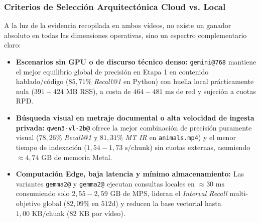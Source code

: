 \subsubsection{Criterios de Selección Arquitectónica Cloud vs. Local}
A la luz de la evidencia recopilada en ambos vídeos, no existe un ganador absoluto en todas las dimensiones operativas, sino un espectro complementario claro:
\begin{itemize}
    \item \textbf{Escenarios sin GPU o de discurso técnico denso:} \texttt{gemini@768} mantiene el mejor equilibrio global de precisión en Etapa 1 en contenido hablado/código ($85,71\%$ \textit{Recall@1} en Python) con huella local prácticamente nula ($391-424\text{ MB}$ RSS), a costa de $464-481\text{ ms}$ de red y sujeción a cuotas RPD.
    \item \textbf{Búsqueda visual en metraje documental o alta velocidad de ingesta privada:} \texttt{qwen3-vl-2b@} ofrece la mejor combinación de precisión puramente visual ($78,26\%$ \textit{Recall@1} y $81,31\%$ \textit{MT IR} en \texttt{animals.mp4}) y el menor tiempo de indexación ($1,54-1,73\text{ s/chunk}$) sin cuotas externas, asumiendo $\approx 4,74\text{ GB}$ de memoria Metal.
    \item \textbf{Computación Edge, baja latencia y mínimo almacenamiento:} Las variantes \texttt{gemma2@} y \texttt{gemma2@} ejecutan consultas locales en $\approx 30\text{ ms}$ consumiendo solo $2,55-2,59\text{ GB}$ de MPS, lideran el \textit{Interval Recall} multi-objetivo global ($82,09\%$ en $512\text{d}$) y reducen la base vectorial hasta $1,00\text{ KB/chunk}$ ($82\text{ KB}$ por vídeo).
\end{itemize}

